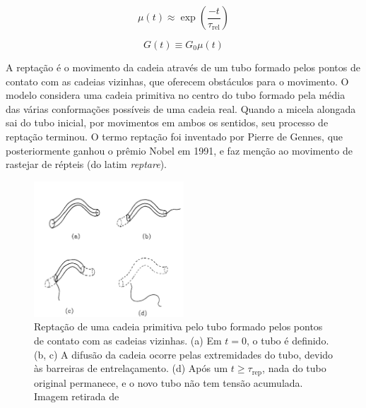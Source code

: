 		\begin{equation}
			\mu(t)  \approx \exp \left(  \frac{-t}{\tau_{\mathrm{rel}}} \right)
			\label{eqn:decaimento_stress}
		\end{equation} %
		
		\begin{equation}
			G(t) \equiv G_0 \mu(t)	
			\label{eqn:decaimento_G_t}
		\end{equation} %
		
		A reptação é o movimento da cadeia através de um tubo formado pelos pontos de contato com as cadeias vizinhas, que oferecem obstáculos para o movimento. O modelo considera uma cadeia primitiva no centro do tubo formado pela média das várias conformações possíveis de uma cadeia real.  %
		Quando a micela alongada sai do tubo inicial, por movimentos em ambos os sentidos, seu processo de reptação terminou. O termo reptação foi inventado por Pierre de Gennes, %
		que posteriormente ganhou o prêmio Nobel em 1991, e faz menção ao movimento de rastejar de répteis (do latim \emph{reptare}). %

		\begin{figure}[h]
			\centering
			\includegraphics[width=0.5\textwidth]{imagens/artigos/reptacao_cates_1987}
			\caption{Reptação de uma cadeia primitiva pelo tubo formado pelos pontos de contato com as cadeias vizinhas. (a) Em \(t=0\), o tubo é definido. (b, c) A difusão da cadeia ocorre pelas extremidades do tubo, devido às barreiras de entrelaçamento. (d) Após um \(t \ge \tau_\mathrm{rep}\), nada do tubo original permanece, e o novo tubo não tem tensão acumulada. Imagem retirada de %
			}
			\label{fig:reptacao_cates1987}
		\end{figure}
		
